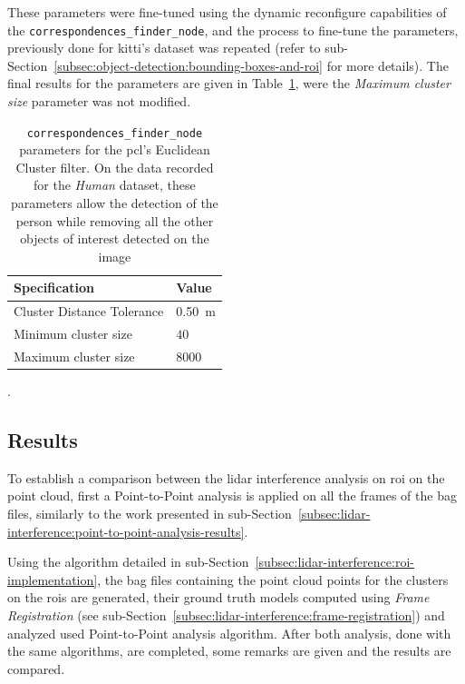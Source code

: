 These parameters were fine-tuned using the dynamic reconfigure capabilities of the \texttt{correspondences\_finder\_node}, and the process to fine-tune the parameters, previously done for \ac{kitti}'s dataset was repeated (refer to sub-Section~\ref{subsec:object-detection:bounding-boxes-and-roi} for more details). The final results for the parameters are given in Table~\ref{tab:experimental-euclidian-cluster-specs}, were the \textit{Maximum cluster size} parameter was not modified.


\begin{table}[!ht]
	\centering
	\renewcommand{\arraystretch}{1.2}
	\begin{tabular}{@{}p{6cm}l@{}}
	 \toprule
	 Specification & Value \\
	 \midrule
	 Cluster Distance Tolerance & \SI{0.50}{\meter} \\
	 Minimum cluster size & $40$ \\
	 Maximum cluster size & $8000$ \\
	 \bottomrule
	\end{tabular}
	\caption[Euclidian cluster parameters to select only the \acs{roi} containing the person on the \textit{Human} dataset.] {\texttt{correspondences\_finder\_node} parameters for the \ac{pcl}'s Euclidean Cluster filter. On the data recorded for the \textit{Human} dataset, these parameters allow the detection of the person while removing all the other objects of interest detected on the image}.
	\label{tab:experimental-euclidian-cluster-specs}
\end{table}

\subsection{Results}
To establish a comparison between the \ac{lidar} interference analysis on \ac{roi} on the point cloud, first a Point-to-Point analysis is applied on all the frames of the bag files, similarly to the work presented in sub-Section~\ref{subsec:lidar-interference:point-to-point-analysis-results}.

Using the algorithm detailed in sub-Section~\ref{subsec:lidar-interference:roi-implementation}, the bag files containing the point cloud points for the clusters on the \acp{roi} are generated, their ground truth models computed using \textit{Frame Registration} (see sub-Section~\ref{subsec:lidar-interference:frame-registration}) and analyzed used Point-to-Point analysis algorithm. After both analysis, done with the same algorithms, are completed, some remarks are given and the results are compared.

